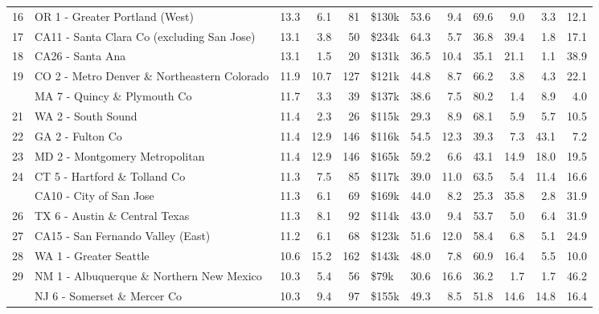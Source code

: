 \begin{table}
\begin{tabular}[t]{llrrrlrrrrrr}
16 & OR 1 - Greater Portland (West) & 13.3 & 6.1 & 81 & \$130k & 53.6 & 9.4 & 69.6 & 9.0 & 3.3 & 12.1\\
17 & CA11 - Santa Clara Co (excluding San Jose) & 13.1 & 3.8 & 50 & \$234k & 64.3 & 5.7 & 36.8 & 39.4 & 1.8 & 17.1\\
18 & CA26 - Santa Ana & 13.1 & 1.5 & 20 & \$131k & 36.5 & 10.4 & 35.1 & 21.1 & 1.1 & 38.9\\
19 & CO 2 - Metro Denver \& Northeastern Colorado & 11.9 & 10.7 & 127 & \$121k & 44.8 & 8.7 & 66.2 & 3.8 & 4.3 & 22.1\\
\addlinespace
20 & MA 7 - Quincy \& Plymouth Co & 11.7 & 3.3 & 39 & \$137k & 38.6 & 7.5 & 80.2 & 1.4 & 8.9 & 4.0\\
21 & WA 2 - South Sound & 11.4 & 2.3 & 26 & \$115k & 29.3 & 8.9 & 68.1 & 5.9 & 5.7 & 10.5\\
22 & GA 2 - Fulton Co & 11.4 & 12.9 & 146 & \$116k & 54.5 & 12.3 & 39.3 & 7.3 & 43.1 & 7.2\\
23 & MD 2 - Montgomery Metropolitan & 11.4 & 12.9 & 146 & \$165k & 59.2 & 6.6 & 43.1 & 14.9 & 18.0 & 19.5\\
24 & CT 5 - Hartford \& Tolland Co & 11.3 & 7.5 & 85 & \$117k & 39.0 & 11.0 & 63.5 & 5.4 & 11.4 & 16.6\\
\addlinespace
25 & CA10 - City of San Jose & 11.3 & 6.1 & 69 & \$169k & 44.0 & 8.2 & 25.3 & 35.8 & 2.8 & 31.9\\
26 & TX 6 - Austin \& Central Texas & 11.3 & 8.1 & 92 & \$114k & 43.0 & 9.4 & 53.7 & 5.0 & 6.4 & 31.9\\
27 & CA15 - San Fernando Valley (East) & 11.2 & 6.1 & 68 & \$123k & 51.6 & 12.0 & 58.4 & 6.8 & 5.1 & 24.9\\
28 & WA 1 - Greater Seattle & 10.6 & 15.2 & 162 & \$143k & 48.0 & 7.8 & 60.9 & 16.4 & 5.5 & 10.0\\
29 & NM 1 - Albuquerque \& Northern New Mexico & 10.3 & 5.4 & 56 & \$79k & 30.6 & 16.6 & 36.2 & 1.7 & 1.7 & 46.2\\
\addlinespace
30 & NJ 6 - Somerset \& Mercer Co & 10.3 & 9.4 & 97 & \$155k & 49.3 & 8.5 & 51.8 & 14.6 & 14.8 & 16.4\\
\bottomrule
\end{tabular}
\end{table}
